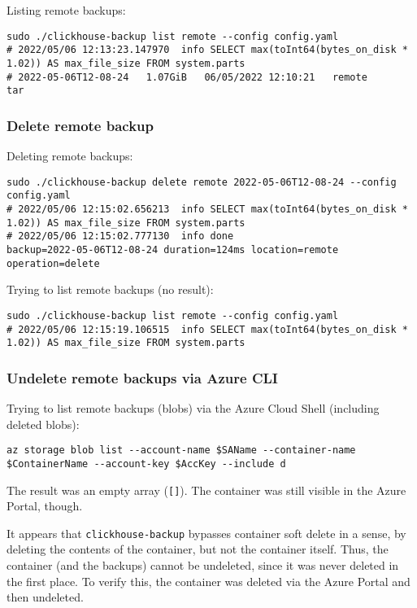 Listing remote backups:
\begin{verbatim}
sudo ./clickhouse-backup list remote --config config.yaml
# 2022/05/06 12:13:23.147970  info SELECT max(toInt64(bytes_on_disk * 1.02)) AS max_file_size FROM system.parts
# 2022-05-06T12-08-24   1.07GiB   06/05/2022 12:10:21   remote      tar
\end{verbatim}

\subsubsection{Delete remote backup}
\label{sec:orgc9798ca}
Deleting remote backups:
\begin{verbatim}
sudo ./clickhouse-backup delete remote 2022-05-06T12-08-24 --config config.yaml
# 2022/05/06 12:15:02.656213  info SELECT max(toInt64(bytes_on_disk * 1.02)) AS max_file_size FROM system.parts
# 2022/05/06 12:15:02.777130  info done                      backup=2022-05-06T12-08-24 duration=124ms location=remote operation=delete
\end{verbatim}

Trying to list remote backups (no result):
\begin{verbatim}
sudo ./clickhouse-backup list remote --config config.yaml
# 2022/05/06 12:15:19.106515  info SELECT max(toInt64(bytes_on_disk * 1.02)) AS max_file_size FROM system.parts
\end{verbatim}

\subsubsection{Undelete remote backups via Azure CLI}
\label{sec:orgba36207}
Trying to list remote backups (blobs) via the Azure Cloud Shell (including deleted blobs):
\begin{verbatim}
az storage blob list --account-name $SAName --container-name $ContainerName --account-key $AccKey --include d
\end{verbatim}

The result was an empty array (\texttt{[]}).
The container was still visible in the Azure Portal, though.

It appears that \texttt{clickhouse-backup} bypasses container soft delete in a sense,
by deleting the contents of the container, but not the container itself.
Thus, the container (and the backups) cannot be undeleted, since it was never deleted in the first place.
To verify this, the container was deleted via the Azure Portal and then undeleted.

